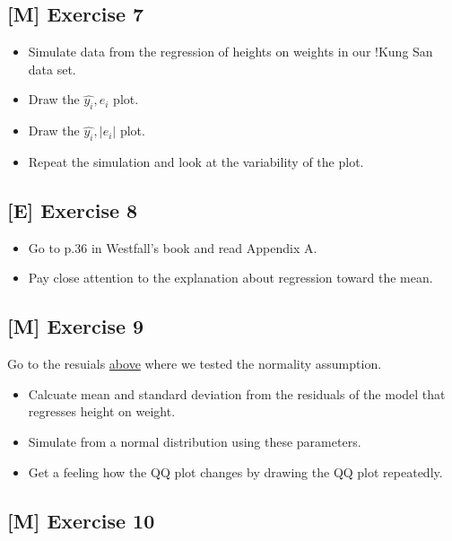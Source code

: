 \documentclass[
]{book}
\providecommand{\tightlist}{%
  \setlength{\itemsep}{0pt}\setlength{\parskip}{0pt}}
\begin{document}
\subsection{{[}M{]} Exercise 7}\label{exercise7_simpl_lin_reg}

\begin{itemize}
\tightlist
\item
  Simulate data from the regression of heights on weights in our !Kung San data set.
\item
  Draw the \(\hat{y_i}, e_i\) plot.
\item
  Draw the \(\hat{y_i}, |e_i|\) plot.
\item
  Repeat the simulation and look at the variability of the plot.
\end{itemize}

\subsection{{[}E{]} Exercise 8}\label{exercise8_simpl_lin_reg}

\begin{itemize}
\tightlist
\item
  Go to p.36 in Westfall's book and read Appendix A.
\item
  Pay close attention to the explanation about regression toward the mean.
\end{itemize}

\subsection{{[}M{]} Exercise 9}\label{exercise9_simpl_lin_reg}

Go to the resuials \hyperref[normality_assumption]{above} where we tested the normality assumption.

\begin{itemize}
\tightlist
\item
  Calcuate mean and standard deviation from the residuals of the model
  that regresses height on weight.
\item
  Simulate from a normal distribution using these parameters.
\item
  Get a feeling how the QQ plot changes by drawing the QQ plot repeatedly.
\end{itemize}

\subsection{{[}M{]} Exercise 10}\label{exercise10_simpl_lin_reg}
\end{document}
